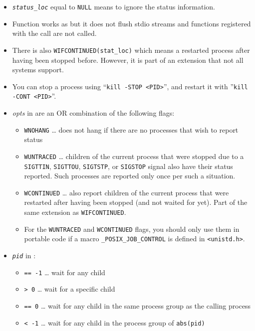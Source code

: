 \begin{itemize}
\item \emph{\texttt{status\_loc}} equal to \texttt{NULL} means to ignore the
status information.
\item Function  works as  but it does not flush stdio
streams and functions registered with the  call are not called.
\item There is also \texttt{WIFCONTINUED(stat\_loc)} which means a restarted
process after having been stopped before.  However, it is part of an extension
that not all systems support.
\item You can stop a process using ``\texttt{kill -STOP <PID>}'',
and restart it with ''\texttt{kill -CONT <PID>}''.
\item \emph{opts} in  are an OR combination of the following
flags:
    \begin{itemize}
    \item \texttt{WNOHANG} \dots{} does not hang if there are no processes
    that wish to report status
    \item \texttt{WUNTRACED} \dots{} children of the current process that were
    stopped due to a \texttt{SIGTTIN}, \texttt{SIGTTOU}, \texttt{SIGTSTP}, or
    \texttt{SIGSTOP} signal also have their status reported.  Such processes are
    reported only once per such a situation.
    \item \texttt{WCONTINUED} \dots{} also report children of the current
    process that were restarted after having been stopped (and not waited for
    yet).  Part of the same extension as \texttt{WIFCONTINUED}.
    \item For the \texttt{WUNTRACED} and \texttt{WCONTINUED} flags, you should
    only use them in portable code if a macro \texttt{\_POSIX\_JOB\_CONT\-ROL}
    is defined in \texttt{<unistd.h>}.
    \end{itemize}
\item \emph{\texttt{pid}} in :
    \begin{itemize}
    \item \texttt{== -1} \dots{} wait for any child
    \item \texttt{> 0} \dots{} wait for a specific child
    \item \texttt{== 0} \dots{} wait for any child in the same process group as
    the calling process
    \item \texttt{< -1} \dots{} wait for any child in the process group of
    \texttt{abs(pid)}
    \end{itemize}

\end{itemize}

